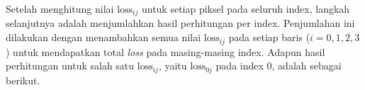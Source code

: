 


Setelah menghitung nilai $\text{loss}_{ij}$ untuk setiap piksel pada seluruh index, langkah selanjutnya adalah menjumlahkan hasil perhitungan per index. Penjumlahan ini dilakukan dengan menambahkan semua nilai $\text{loss}_{ij}$ pada setiap baris ($i = 0, 1, 2, 3$) untuk mendapatkan total \textit{loss} pada masing-masing index. Adapun hasil perhitungan untuk salah satu $\text{loss}_{ij}$, yaitu $\text{loss}_{0j}$ pada index 0, adalah sebagai berikut. \par

